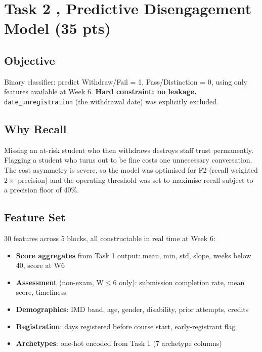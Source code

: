 \documentclass[10pt,a4paper]{article}
\begin{document}
\newpage


\section{Task 2 , Predictive Disengagement Model \textnormal{\small(35 pts)}}

\subsection{Objective} Binary classifier: predict Withdraw/Fail = 1, Pass/Distinction = 0,
using only features available at Week 6. \textbf{Hard constraint: no leakage.}
\texttt{date\_unregistration} (the withdrawal date) was explicitly excluded.

\subsection{Why Recall} Missing an at-risk student who then withdraws destroys staff trust
permanently. Flagging a student who turns out to be fine costs one unnecessary conversation.
The cost asymmetry is severe, so the model was optimised for F2 (recall weighted $2\times$
precision) and the operating threshold was set to maximise recall subject to a precision
floor of 40\%.

\subsection{Feature Set} 30 features across 5 blocks, all constructable in real time at Week 6:

\begin{itemize}
  \item \textbf{Score aggregates} from Task 1 output: mean, min, std, slope, weeks below 40, score at W6
  \item \textbf{Assessment} (non-exam, W$\leq$6 only): submission completion rate, mean score, timeliness
  \item \textbf{Demographics}: IMD band, age, gender, disability, prior attempts, credits
  \item \textbf{Registration}: days registered before course start, early-registrant flag
  \item \textbf{Archetypes}: one-hot encoded from Task 1 (7 archetype columns)
\end{itemize}
\end{document}
